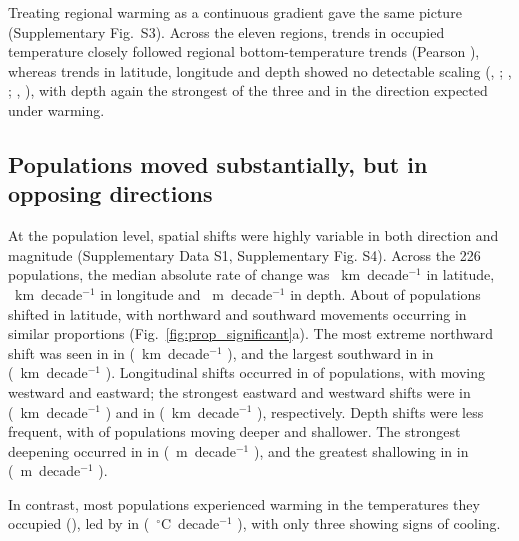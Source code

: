 \documentclass[9pt,twocolumn,twoside]{pnas-new}
\begin{document}
Treating regional warming as a continuous gradient gave the same picture (Supplementary Fig.~S3). Across the eleven regions, trends in occupied temperature closely followed regional bottom-temperature trends (Pearson \CorThermal{}), whereas trends in latitude, longitude and depth showed no detectable scaling (\CorLat{}, \CorLatCI{}; \CorLon{}, \CorLonCI{}; \CorDepth{}, \CorDepthCI{}), with depth again the strongest of the three and in the direction expected under warming.

\subsection*{Populations moved substantially, but in opposing directions}




At the population level, spatial shifts were highly variable in both direction and magnitude (Supplementary Data S1, Supplementary Fig. S4). Across the 226 populations, the median absolute rate of change was \LatMedAbs{}~km~decade$^{-1}$ in latitude, \LonMedAbs{}~km~decade$^{-1}$ in longitude and \DepthMedAbs{}~m~decade$^{-1}$ in depth. About \LatPerc{} of populations shifted in latitude, with northward and southward movements occurring in similar proportions (Fig.~\ref{fig:prop_significant}a). The most extreme northward shift was seen in \MaxLatSpecies{} in \MaxLatRegion{} (\MaxLatMedian{}~km~decade$^{-1}$ \MaxLatCI{}), and the largest southward in \MinLatSpecies{} in \MinLatRegion{} (\MinLatMedian{}~km~decade$^{-1}$ \MinLatCI{}). Longitudinal shifts occurred in \LonPerc{} of populations, with \LonWestingPerc{} moving westward and \LonEastingPerc{} eastward; the strongest eastward and westward shifts were \MaxLonSpecies{} in \MaxLonRegion{} (\MaxLonMedian{}~km~decade$^{-1}$ \MaxLonCI{}) and \MinLonSpecies{} in \MinLonRegion{} (\MinLonMedian{}~km~decade$^{-1}$ \MinLonCI{}), respectively. Depth shifts were less frequent, with \DepthDeepeningPerc{} of populations moving deeper and \DepthShallowingPerc{} shallower. The strongest deepening occurred in \MaxDepthSpecies{} in \MaxDepthRegion{} (\MaxDepthMedian{}~m~decade$^{-1}$ \MaxDepthCI{}), and the greatest shallowing in \MinDepthSpecies{} in \MinDepthRegion{} (\MinDepthMedian{}~m~decade$^{-1}$ \MinDepthCI{}).

In contrast, most populations experienced warming in the temperatures they occupied (\ThermalPerc{}), led by \MaxThermalSpecies{} in \MaxThermalRegion{} (\MaxThermalMedian{}~$^\circ$C~decade$^{-1}$ \MaxThermalCI{}), with only three showing signs of cooling.
\end{document}
